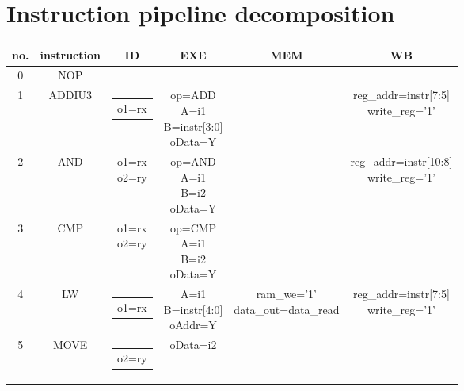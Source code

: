 \documentclass[10pt]{article}
\makeatletter
\newcommand{\zcell}[2]{\begin{tabular}{@{}#1@{}}#2\end{tabular}}
\makeatother
\begin{document}
\section{Instruction pipeline decomposition}
\begin{center}
\begin{longtable}{|c|c|c|c|c|c|}\hline
no.&instruction& ID               & EXE               & MEM                     & WB \\\hline
0  &   NOP     &                  &                   &                         &    \\\hline
1  &  ADDIU3   &\zcell{c}{o1=rx}  &\zcell{c}{op=ADD\\ 
								   A=i1\\
								   B=instr[3:0]\\
								   oData=Y}           &                         &\zcell{c}{
																				 reg\_addr=instr[7:5]\\
														                         write\_reg='1'}\\\hline
2  &  AND      &\zcell{c}{o1=rx\\                                                      
				o2=ry}            &\zcell{c}{op=AND\\ 
								   A=i1\\
								   B=i2\\oData=Y}     &                         &\zcell{c}{
																				 reg\_addr=instr[10:8]\\
														                         write\_reg='1'}\\\hline
3  & CMP       &\zcell{c}{o1=rx\\                                                            
				o2=ry}            &\zcell{c}{op=CMP\\ 
								   A=i1\\
								   B=i2\\oData=Y}     &                         &    \\\hline
4  & LW        &\zcell{c}{o1=rx}  &\zcell{c}{A=i1\\
							       B=instr[4:0]\\
								   oAddr=Y}           &\zcell{c}{ram\_we='1'\\
													   data\_out=data\_read}    &\zcell{c}{
																				 reg\_addr=instr[7:5]\\
														                         write\_reg='1'}\\\hline
5  & MOVE      &\zcell{c}{o2=ry}  &oData=i2           &                         &\zcell{c}{
}
\end{longtable}
\end{center}
\end{document}
